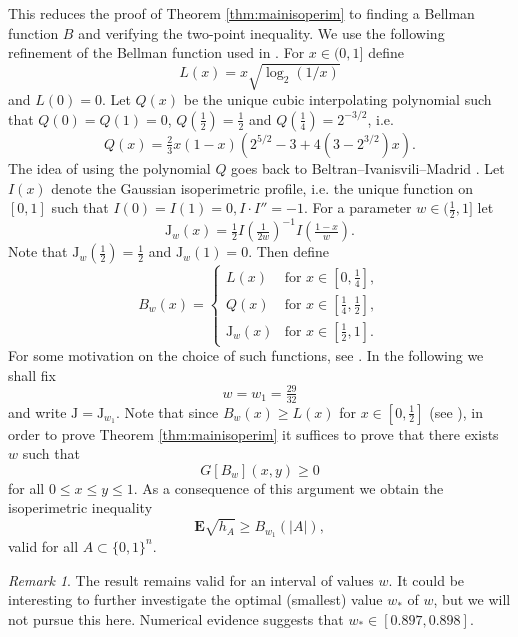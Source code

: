 \documentclass[11pt]{amsart}
\theoremstyle{plain}
\theoremstyle{definition}
\theoremstyle{remark}
\newtheorem{rem}[thm]{Remark}
\numberwithin{equation}{section}
\begin{document}
This reduces the proof of Theorem \ref{thm:mainisoperim} to finding a Bellman function $B$ and verifying the two-point inequality.
We use the following refinement of the Bellman function used in \cite{DIR24}.
For $x\in (0,1]$ define
\[ L(x) = x \sqrt{\log_2(1/x)} \]
and $L(0)=0$.
Let $Q(x)$ be the unique cubic interpolating polynomial such that $Q(0)=Q(1)=0$, $Q(\frac12)=\frac12$ and $Q(\frac14)=2^{-3/2}$, i.e.
\[ Q(x) = \tfrac23 x (1-x)(2^{5/2}-3+4(3-2^{3/2}) x). \]
The idea of using the polynomial $Q$ goes back to Beltran--Ivanisvili--Madrid \cite{BIM23}.
Let $I(x)$ denote the Gaussian isoperimetric profile, i.e. the unique function on $[0,1]$ such that
$I(0)=I(1)=0, I\cdot I''=-1$.
For a parameter $w\in (\frac12,1]$ let
\[ {\mathrm{J}}_w(x) = \tfrac12 I(\tfrac1{2w})^{-1} I(\tfrac{1-x}{w}). \]
Note that ${\mathrm{J}}_w(\frac12)=\frac12$ and ${\mathrm{J}}_w(1)=0$.
Then define
\begin{equation}\label{eqn:bbdef}
B_w(x) = \left\{ \begin{array}{ll}
L(x) & \text{for } x\in [0, \frac14],\\
Q(x)
& \text{for }x\in [\frac14, \frac12],\\
{\mathrm{J}}_w(x) & \text{for }x\in [\frac12, 1].
\end{array}\right.
\end{equation}
For some motivation on the choice of such functions, see \cite[\S 2]{DIR24}.
In the following we shall fix
\begin{equation}\label{eqn:w1def}
w=w_1=\tfrac{29}{32}
\end{equation}
and write ${\mathrm{J}}={\mathrm{J}}_{w_1}$.
Note that since $B_w(x)\ge L(x)$ for $x\in [0,\frac12]$ (see \cite[Lemma 5.9 (2)]{DIR24}), in order to prove Theorem \ref{thm:mainisoperim} it suffices to prove that there exists $w$ such that
\begin{equation}\label{eqn:maintwopt}
G[B_w](x,y)\ge 0
\end{equation}
for all $0\le x\le y\le 1$.
As a consequence of this argument we obtain the isoperimetric inequality
\begin{equation}\label{eqn:isoperim2}
\mathbf{E} \sqrt{h_A} \ge B_{w_1}(|A|),
\end{equation}
valid for all $A\subset \{0,1\}^n$.

\begin{rem}The result remains valid for an interval of values $w$.
It could be interesting to further investigate the optimal (smallest) value $w_*$ of $w$, but we will not pursue this here. Numerical evidence suggests that $w_*\in [0.897, 0.898]$.
\end{rem}
\end{document}
